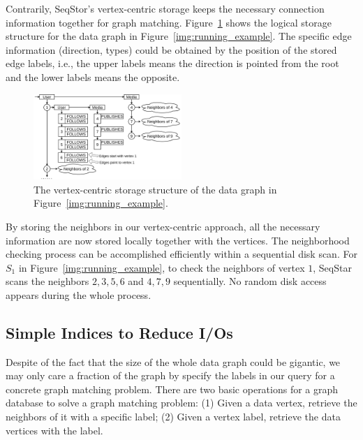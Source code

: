 Contrarily, SeqStor's vertex-centric storage keeps the necessary connection information together for graph matching.
Figure~\ref{img:data_example} shows the logical storage structure for the data graph in Figure~\ref{img:running_example}.
The specific edge information (direction, types) could be obtained by the position of the stored edge labels, i.e.,
the upper labels means the direction is pointed from the root and the lower labels means the opposite.

\begin{figure}[ht]
  \centering
  \includegraphics[width=0.5\textwidth]{img/data_example.pdf}
  \caption{The vertex-centric storage structure of the data graph in Figure~\ref{img:running_example}.}\label{img:data_example}
\end{figure}

By storing the neighbors in our vertex-centric approach,
all the necessary information are now stored locally together with the vertices.
The neighborhood checking process can be accomplished efficiently within a sequential disk scan.
For $S_1$ in Figure~\ref{img:running_example},
to check the neighbors of vertex $1$, SeqStar scans the neighbors $2, 3, 5, 6$ and $4, 7, 9$ sequentially.
No random disk access appears during the whole process.
\subsection{Simple Indices to Reduce I/Os}
Despite of the fact that the size of the whole data graph could be gigantic,
we may only care a fraction of the graph by specify the labels in our query for a concrete graph matching problem.
There are two basic operations for a graph database to solve a graph matching problem:
(1) Given a data vertex, retrieve the neighbors of it with a specific label;
(2) Given a vertex label, retrieve the data vertices with the label.

